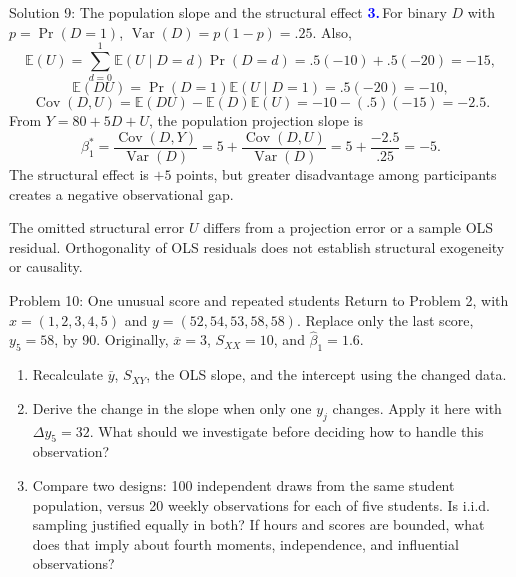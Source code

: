 \documentclass[notes,10pt, aspectratio=169]{beamer}
\newcommand{\E}{\mathbb{E}}
\newcommand{\Var}{\operatorname{Var}}
\newcommand{\Cov}{\operatorname{Cov}}
\newcommand{\answerpart}[1]{\textcolor{blue}{\textbf{#1.}}\,}
\begin{document}
\begin{frame}{Solution 9: The population slope and the structural effect}
\small
\answerpart{3}For binary $D$ with $p=\Pr(D=1)$, $\Var(D)=p(1-p)=.25$. Also,
\[
\E(U)=\sum_{d=0}^1\E(U\mid D=d)\Pr(D=d)
=.5(-10)+.5(-20)=-15,
\]
\[
\E(DU)=\Pr(D=1)\E(U\mid D=1)=.5(-20)=-10,
\]
\[
\Cov(D,U)=\E(DU)-\E(D)\E(U)=-10-(.5)(-15)=-2.5.
\]
From $Y=80+5D+U$, the population projection slope is
\[
\beta_1^*=\frac{\Cov(D,Y)}{\Var(D)}
=5+\frac{\Cov(D,U)}{\Var(D)}
=5+\frac{-2.5}{.25}=\boxed{-5}.
\]
The structural effect is $+5$ points, but greater disadvantage among participants creates a negative observational gap.

\par\vspace{5pt}
The omitted structural error $U$ differs from a projection error or a sample OLS residual. Orthogonality of OLS residuals does not establish structural exogeneity or causality.
\end{frame}
\fi

\begin{frame}{Problem 10: One unusual score and repeated students}
Return to Problem 2, with $x=(1,2,3,4,5)$ and $y=(52,54,53,58,58)$. Replace only the last score, $y_5=58$, by 90. Originally, $\overline x=3$, $S_{XX}=10$, and $\widehat\beta_1=1.6$.
\begin{enumerate}
\setlength{\itemsep}{10pt}
\item Recalculate $\overline y$, $S_{XY}$, the OLS slope, and the intercept using the changed data.
\item Derive the change in the slope when only one $y_j$ changes. Apply it here with $\Delta y_5=32$. What should we investigate before deciding how to handle this observation?
\item Compare two designs: 100 independent draws from the same student population, versus 20 weekly observations for each of five students. Is i.i.d. sampling justified equally in both? If hours and scores are bounded, what does that imply about fourth moments, independence, and influential observations?
\end{enumerate}
\end{frame}
\end{document}
